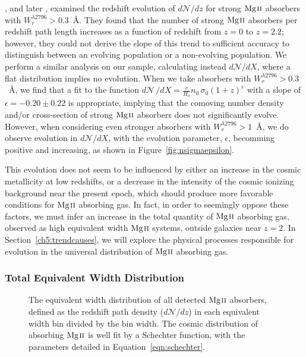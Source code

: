 \cite{Steidel1992}, and later \cite{Nestor2005}, examined the redshift evolution of $d\mathcal{N}\!/dz$ for strong ${\hbox{{\rm Mg}\kern 0.1em{\sc ii}}}$ absorbers with $W_r^{\lambda2796} > 0.3$~{\AA}. They found that the number of strong ${\hbox{{\rm Mg}\kern 0.1em{\sc ii}}}$ absorbers per redshift path length increases as a function of redshift from $z = 0$ to $z = 2.2$; however, they could not derive the slope of this trend to sufficient accuracy to distinguish between an evolving population or a non-evolving population. We perform a similar analysis on our sample, calculating instead $d\mathcal{N}\!/dX$, where a flat distribution implies no evolution. When we take absorbers with $W_r^{\lambda2796} > 0.3$~{\AA}, we find that a fit to the function $d\mathcal{N}\,/dX = \frac{c}{H_o}n_0\,\sigma_0(1+z)^{\epsilon}$ with a slope of $\epsilon = -0.20 \pm 0.22$ is appropriate, implying that the comoving number density and/or cross-section of strong ${\hbox{{\rm Mg}\kern 0.1em{\sc ii}}}$ absorbers does not significantly evolve. However, when considering even stronger absorbers with $W_r^{\lambda2796} > 1$~{\AA}, we do observe evolution in $d\mathcal{N}\!/dX$, with the evolution parameter, $\epsilon$, becomming positive and increasing, as shown in Figure~\ref{fig:nsigmaepsilon}.

This evolution does not seem to be influenced by either an increase in the cosmic metallicity at low redshifts, or a decrease in the intensity of the cosmic ionizing background near the present epoch, which should produce more favorable conditions for ${\hbox{{\rm Mg}\kern 0.1em{\sc ii}}}$ absorbing gas. In fact, in order to seemingly oppose these factors, we must infer an increase in the total quantity of ${\hbox{{\rm Mg}\kern 0.1em{\sc ii}}}$ absorbing gas, observed as high equivalent width ${\hbox{{\rm Mg}\kern 0.1em{\sc ii}}}$ systems, outside galaxies near $z = 2$. In Section~\ref{ch5:trendcauses}, we will explore the physical processes responsible for evolution in the universal distribution of ${\hbox{{\rm Mg}\kern 0.1em{\sc ii}}}$ absorbing gas.

\subsubsection{Total Equivalent Width Distribution}
\label{ch5:totaldistro}

\begin{figure}[bth]
\caption{The equivalent width distribution of all detected ${\hbox{{\rm Mg}\kern 0.1em{\sc ii}}}$ absorbers, defined as the redshift path density ($d\mathcal{N}\!/dz$) in each equivalent width bin divided by the bin width. The cosmic distribution of absorbing ${\hbox{{\rm Mg}\kern 0.1em{\sc ii}}}$ is well fit by a Schechter function, with the parameters detailed in Equation~\ref{eqn:schechter}.}
\label{fig:totalewdistro}
\end{figure}

